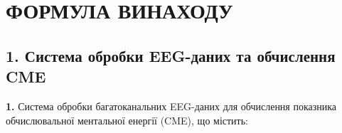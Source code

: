 \documentclass[12pt,a4paper]{article}
\begin{document}
\section{ФОРМУЛА ВИНАХОДУ}\label{ux444ux43eux440ux43cux443ux43bux430-ux432ux438ux43dux430ux445ux43eux434ux443}



\subsection{1. Система обробки EEG-даних та обчислення CME}\label{ux441ux438ux441ux442ux435ux43cux430-ux43eux431ux440ux43eux431ux43aux438-eeg-ux434ux430ux43dux438ux445-ux442ux430-ux43eux431ux447ux438ux441ux43bux435ux43dux43dux44f-cme}



\textbf{1.} Система обробки багатоканальних EEG-даних для обчислення показника обчислювальної ментальної енергії (CME), що містить:
\end{document}
